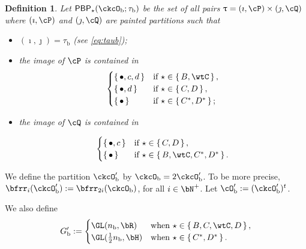 \documentclass[12pt,a4paper]{amsart}
\def\abs#1{\left|{#1}\right|}
\numberwithin{equation}{section}
\newtheorem{defn}[thm]{Definition}
\theoremstyle{remark}
\def\half{{\tfrac{1}{2}}}
\def\cupcol{{\stackrel{c}{\sqcup}}}
\def\cupcol{{\,\stackrel{c}{\sqcup}\,}}
\def\ckcOb{\ckcO_{\mathrm b}}
\def\ckcOpb{\ckcO'_{\mathrm b}}
\def\PBPs{\mathsf{PBP}_{\star}}
\begin{document}
\begin{defn}
  Let $\PBPs(\ckcOb;\tau_{\mathrm b})$ be the set of all pairs
  $\uptau = (\imath,\cP)\times(\jmath,\cQ)$ where $(\imath,\cP)$ and
  $(\jmath,\cQ)$ are painted partitions such that
  \begin{itemize}
    \item $(\imath,\jmath) = \tau_{\mathrm b}$ (see \eqref{eq:taub});
    \item the image of $\cP$ is contained in
          \[
          \begin{cases}
            \set{\bullet, c,d}  & \text{if } \star\in \set{B,\wtC}, \\
            \set{\bullet, d}  & \text{if } \star\in \set{C,D},\\
            \set{\bullet}  & \text{if } \star\in \set{C^{*},D^{*}};\\
          \end{cases}
          \]
    \item the image of $\cQ$ is contained in

          \[
          \begin{cases}
            \set{\bullet, c}  & \text{if } \star\in \set{C,D},\\
            \set{\bullet}  & \text{if } \star\in \set{B,\wtC, C^{*},D^{*}}.\\
          \end{cases}
          \]
  \end{itemize}
\end{defn}

We define the partition $\ckcOpb$ by $\ckcOb = 2\ckcOpb$. To be more precise, $\bfrr_{i}(\ckcO'_{\mathrm b}):= \bfrr_{2i}(\ckcO_{\mathrm b})$, for all $i\in \bN^{+}$. Let $\cO'_{\mathrm b}:= (\ckcO'_{\mathrm b})^{t}$.

We also define
\begin{equation}\label{Gpb}
  G'_{\mathrm b} := \begin{cases}
    \GL(n_{\mathrm b},\bR) & \text{when } \star \in \set{B,C,\wtC,D}, \\
    \GL(\half n_{\mathrm b},\bH) & \text{when } \star \in \set{C^{*},D^{*}}.\\
  \end{cases}
\end{equation}
\end{document}
